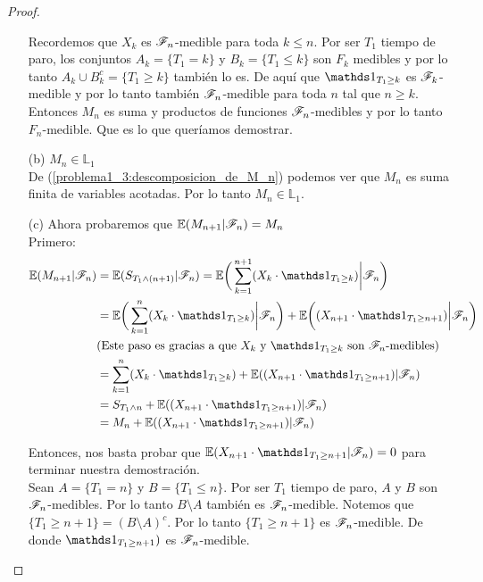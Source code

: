 \begin{proof}
\begin{itemize}
				Recordemos que $X_k$ es $\mathscr{F}_n$-medible para toda $k \leq n $. Por ser
				$T_1$ tiempo de paro, los conjuntos $A_k = \{T_1 = k\}$ y 
				$B_k = \{T_1 \leq k\}$	son $F_k$ medibles y por lo tanto 
				$A_k \cup B_k^c = \{ T_1 \geq k\}$ también lo es. De aquí que 
				$\indic_{T_1 \geq k}$ es $\mathscr{F}_k$-medible y por lo tanto también $\mathscr{F}_n$-medible
				para toda $n$ tal que $n \geq k$.\\
				  
				Entonces $M_n$ es suma y productos de funciones $\mathscr{F}_n$-medibles y por lo tanto
				$F_n$-medible. Que es lo que queríamos demostrar.\\
				
			\item[(b)]
				$M_n \in \mathbb{L}_1$\\
				
				De (\ref{problema1_3:descomposicion_de_M_n}) podemos ver que $M_n$ es 
				suma finita de variables acotadas. Por lo tanto $M_n \in \mathbb{L}_1$.\\
				
			\item[(c)] Ahora probaremos que	$\mathbb{E}(M_{n+1} | \mathscr{F}_{n}) = M_{n}$\\
				
				Primero:
				\begin{align}
					\E(M_{n+1} | \F_{n}) &= \E( S_{T_1 \wedge (n+1)} | \F_{n}) = 
					\E\bigg( \sum_{k=1}^{n+1} (X_k \cdot \indic_{T_1 \geq k})\bigg| \F_{n}\bigg) \\	 			
					& =\E\bigg( \sum_{k=1}^{n} (X_k \cdot \indic_{T_1 \geq k}) \bigg| \F_{n}\bigg) +
					\E\bigg((X_{n+1} \cdot \indic_{T_1 \geq n+1}) \bigg| \F_{n}\bigg) \\
					&\mbox{(Este paso es gracias a que $X_k$ y $\indic_{T_1 \geq k}$ son $\F_n$-medibles)}\\
					& = \sum_{k=1}^{n} (X_k \cdot \indic_{T_1 \geq k}) + 
					\E((X_{n+1} \cdot \indic_{T_1 \geq n+1}) | \F_{n}) \\
					& = S_{T_1 \wedge n} + \E((X_{n+1} \cdot \indic_{T_1 \geq n+1}) | \F_{n}) \\
					& = M_n + \E((X_{n+1} \cdot \indic_{T_1 \geq n+1}) | \F_{n})
				\end{align}
				
				Entonces, nos basta probar que $\E(X_{n+1} \cdot \indic_{T_1 \geq n+1} |
				 \F_{n}) = 0$ para terminar nuestra demostración.\\
				 
				Sean $A = \{T_1 = n\}$ y $B = \{ T_1 \leq n\}$. Por ser $T_1$ tiempo de paro,
				$A$ y $B$ son $\mathscr{F}_n$-medibles. Por lo tanto $B \setminus A$ también es $\mathscr{F}_n$-medible. 
				Notemos que $\{T_1 \geq n+1\} = (B \setminus A)^c$. Por lo tanto $\{T_1 \geq n+1\}$ es
				$\mathscr{F}_n$-medible. De donde  $\indic_{T_1 \geq n+1})$ es $\mathscr{F}_n$-medible.\\
				

\end{itemize}
\end{proof}
